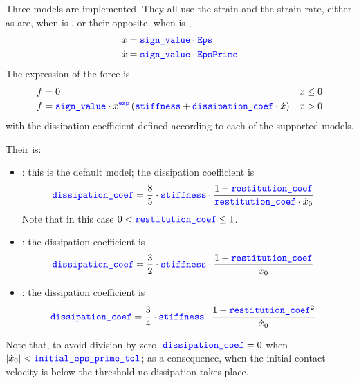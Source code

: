 Three models are implemented. They all use the strain and the strain rate, either as are, when  is ,
or their opposite, when  is ,
\begin{subequations}
\begin{align}
	x &= \textcolor{blue}{\texttt{sign\_value}} \cdot \textcolor{blue}{\texttt{Eps}}
	\\
	\dot{x} &= \textcolor{blue}{\texttt{sign\_value}} \cdot \textcolor{blue}{\texttt{EpsPrime}}
\end{align}
\end{subequations}
The expression of the force is
\begin{subequations}
\begin{align}
	f &= 0 && \text{$x \le 0$}
	\\
	f &= \textcolor{blue}{\texttt{sign\_value}} \cdot  x^{\textcolor{blue}{\texttt{exp}}} \left(  \textcolor{blue}{\texttt{stiffness}} + \textcolor{blue}{\texttt{dissipation\_coef}} \cdot \dot{x} \right) && \text{$x > 0$}
\end{align}
\end{subequations}
with the dissipation coefficient  defined according to each of the supported models.

Their  is:
\begin{itemize}
\item {} \cite{FLORES-2011-MUBO}: this is the default model; the dissipation coefficient is
\begin{align}
	\textcolor{blue}{\texttt{dissipation\_coef}} &= \frac{8}{5} \cdot \textcolor{blue}{\texttt{stiffness}} \cdot \frac{1 - \textcolor{blue}{\texttt{restitution\_coef}}}{\textcolor{blue}{\texttt{restitution\_coef}} \cdot \dot{x}_0}
\end{align}
Note that in this case $0 < \textcolor{blue}{\texttt{restitution\_coef}} \le 1$.

\item {} \cite{HUNT-1975}: the dissipation coefficient is
\begin{align}
	\textcolor{blue}{\texttt{dissipation\_coef}} &= \frac{3}{2} \cdot \textcolor{blue}{\texttt{stiffness}} \cdot \frac{1 - \textcolor{blue}{\texttt{restitution\_coef}}}{\dot{x}_0}
\end{align}

\item {} \cite{LANKARANI-1994-ND}: the dissipation coefficient is
\begin{align}
	\textcolor{blue}{\texttt{dissipation\_coef}} &= \frac{3}{4} \cdot \textcolor{blue}{\texttt{stiffness}} \cdot \frac{1 - \textcolor{blue}{\texttt{restitution\_coef}}^2}{\dot{x}_0}
\end{align}
\end{itemize}
Note that, to avoid division by zero, $\textcolor{blue}{\texttt{dissipation\_coef}} = 0$ when $|\dot{x}_0| < \textcolor{blue}{\texttt{initial\_eps\_prime\_tol}}$;
as a consequence, when the initial contact velocity is below the threshold no dissipation takes place.

